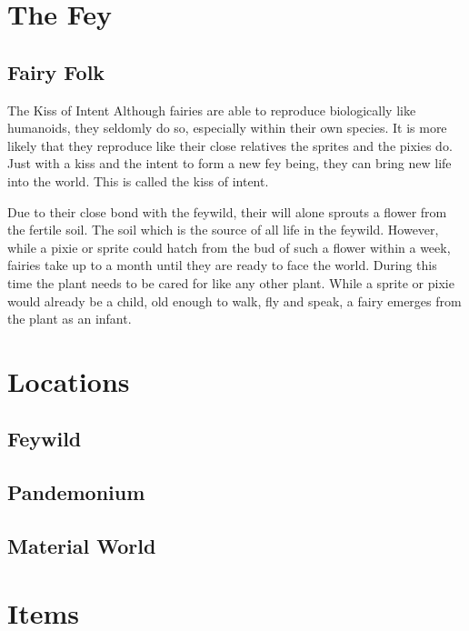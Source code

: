 \documentclass[letter,10pt,twocolumn,openany]{dndbook}
\begin{document}
\chapter{The Fey}

\section{Fairy Folk}

\begin{DndComment}{The Kiss of Intent}
  Although fairies are able to reproduce biologically like humanoids, they seldomly do so, especially within their own species.
  It is more likely that they reproduce like their close relatives the sprites and the pixies do.
  Just with a kiss and the intent to form a new fey being, they can bring new life into the world.
  This is called the kiss of intent.

  Due to their close bond with the feywild, their will alone sprouts a flower from the fertile soil.
  The soil which is the source of all life in the feywild.
  However, while a pixie or sprite could hatch from the bud of such a flower within a week, fairies take up to a month until they are ready to face the world.
  During this time the plant needs to be cared for like any other plant.
  While a sprite or pixie would already be a child, old enough to walk, fly and speak, a fairy emerges from the plant as an infant.
\end{DndComment}


\chapter{Locations}

\section{Feywild}
\section{Pandemonium}
\section{Material World}

\chapter{Items}

\end{document}
